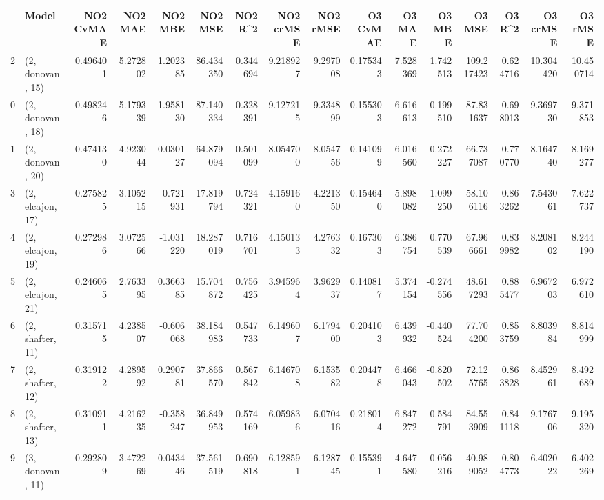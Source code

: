 \begin{tabular}{llrrrrrrrrrrrrrr}
\toprule
{} &             Model &  NO2 CvMAE &   NO2 MAE &   NO2 MBE &    NO2 MSE &   NO2 R\textasciicircum2 &  NO2 crMSE &  NO2 rMSE &  O3 CvMAE &     O3 MAE &    O3 MBE &      O3 MSE &    O3 R\textasciicircum2 &   O3 crMSE &    O3 rMSE \\
\midrule
2  &  (2, donovan, 15) &   0.496401 &  5.272802 &  1.202385 &  86.434350 &  0.344694 &   9.218927 &  9.297008 &  0.175343 &   7.528369 &  1.742513 &  109.217423 &  0.624716 &  10.304420 &  10.450714 \\
0  &  (2, donovan, 18) &   0.498246 &  5.179339 &  1.958130 &  87.140334 &  0.328391 &   9.127215 &  9.334899 &  0.155303 &   6.616613 &  0.199510 &   87.831637 &  0.698013 &   9.369730 &   9.371853 \\
1  &  (2, donovan, 20) &   0.474130 &  4.923044 &  0.030127 &  64.879094 &  0.501099 &   8.054700 &  8.054756 &  0.141099 &   6.016560 & -0.272227 &   66.737087 &  0.770770 &   8.164740 &   8.169277 \\
3  &  (2, elcajon, 17) &   0.275825 &  3.105215 & -0.721931 &  17.819794 &  0.724321 &   4.159160 &  4.221350 &  0.154640 &   5.898082 &  1.099250 &   58.106116 &  0.863262 &   7.543061 &   7.622737 \\
4  &  (2, elcajon, 19) &   0.272986 &  3.072566 & -1.031220 &  18.287019 &  0.716701 &   4.150133 &  4.276332 &  0.167303 &   6.386754 &  0.770539 &   67.966661 &  0.839982 &   8.208102 &   8.244190 \\
5  &  (2, elcajon, 21) &   0.246065 &  2.763395 &  0.366385 &  15.704872 &  0.756425 &   3.945964 &  3.962937 &  0.140817 &   5.374154 & -0.274556 &   48.617293 &  0.885477 &   6.967203 &   6.972610 \\
6  &  (2, shafter, 11) &   0.315715 &  4.238507 & -0.606068 &  38.184983 &  0.547733 &   6.149607 &  6.179400 &  0.204103 &   6.439932 & -0.440524 &   77.704200 &  0.853759 &   8.803984 &   8.814999 \\
7  &  (2, shafter, 12) &   0.319122 &  4.289592 &  0.290781 &  37.866570 &  0.567842 &   6.146708 &  6.153582 &  0.204478 &   6.466043 & -0.820502 &   72.125765 &  0.863828 &   8.452961 &   8.492689 \\
8  &  (2, shafter, 13) &   0.310911 &  4.216235 & -0.358247 &  36.849953 &  0.574169 &   6.059836 &  6.070416 &  0.218014 &   6.847272 &  0.584791 &   84.553909 &  0.841118 &   9.176706 &   9.195320 \\
9  &  (3, donovan, 11) &   0.292809 &  3.472269 &  0.043446 &  37.561519 &  0.690818 &   6.128591 &  6.128745 &  0.155391 &   4.647580 &  0.056216 &   40.989052 &  0.804773 &   6.402022 &   6.402269 \\

\end{tabular}
